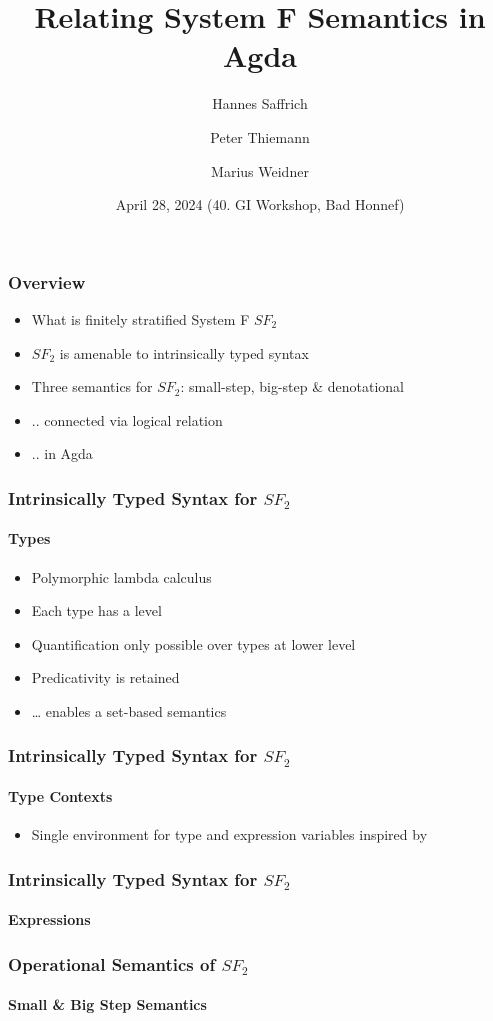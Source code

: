 \documentclass[dvipsnames,aspectratio=169,pdftex]{beamer}
\title{Relating System F Semantics in Agda}
\author[Saffrich, Thiemann, Weidner] {
  Hannes Saffrich \and 
  Peter Thiemann \and
  Marius Weidner
}
\institute{University of Freiburg}
\date{April 28, 2024 (40. GI Workshop, Bad Honnef)}
\begin{document}
\begin{frame}{\null}
  \titlepage 
\end{frame}

\begin{frame}[fragile]
  \frametitle{Overview}
  \begin{itemize}
    \item What is finitely stratified System F $SF_2$ \cite{DBLP:journals/iandc/Leivant91}
    \item $SF_2$ is amenable to intrinsically typed syntax
    \item Three semantics for $SF_2$: small-step, big-step \& denotational
    \item .. connected via logical relation
    \item .. in Agda
  \end{itemize}
\end{frame}

\begin{frame}
  \frametitle{Intrinsically Typed Syntax for $SF_2$}
  \framesubtitle{Types}
  \TFLEnv
  \TFType
  \begin{itemize}
    \item Polymorphic lambda calculus \cite{girard72:_inter,DBLP:conf/programm/Reynolds74}
    \item Each type has a level
    \item Quantification only possible over types at lower level
    \item Predicativity is retained
    \item \dots{} enables a set-based semantics
  \end{itemize}
\end{frame}

\begin{frame}
  \frametitle{Intrinsically Typed Syntax for $SF_2$}
  \framesubtitle{Type Contexts}
  \TFTVEnv
  \TFinn
  \begin{itemize}
    \item Single environment for type and expression variables inspired by \cite{DBLP:conf/mpc/ChapmanKNW19}
  \end{itemize}
\end{frame}

\begin{frame}
  \frametitle{Intrinsically Typed Syntax for $SF_2$}
  \framesubtitle{Expressions}
  \TFExprExcerpt
\end{frame}

\begin{frame}
  \frametitle{Operational Semantics of $SF_2$}
  \framesubtitle{Small \& Big Step Semantics}
  \SingleReductionExcerpt
  \SemanticsExcerpt
\end{frame}
\end{document}
